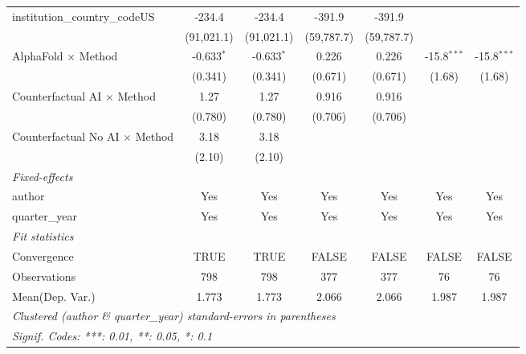\begin{tabular}{lcccccc}
   institution\_country\_codeUS          & -234.4       & -234.4       & -391.9      & -391.9      &               &   \\   
                                         & (91,021.1)   & (91,021.1)   & (59,787.7)  & (59,787.7)  &               &   \\   
   AlphaFold $\times$ Method             & -0.633$^{*}$ & -0.633$^{*}$ & 0.226       & 0.226       & -15.8$^{***}$ & -15.8$^{***}$\\   
                                         & (0.341)      & (0.341)      & (0.671)     & (0.671)     & (1.68)        & (1.68)\\   
   Counterfactual AI $\times$ Method     & 1.27         & 1.27         & 0.916       & 0.916       &               &   \\   
                                         & (0.780)      & (0.780)      & (0.706)     & (0.706)     &               &   \\   
   Counterfactual No AI $\times$ Method  & 3.18         & 3.18         &             &             &               &   \\   
                                         & (2.10)       & (2.10)       &             &             &               &   \\   
   \midrule
   \emph{Fixed-effects}\\
   author                                & Yes          & Yes          & Yes         & Yes         & Yes           & Yes\\  
   quarter\_year                         & Yes          & Yes          & Yes         & Yes         & Yes           & Yes\\  
   \midrule
   \emph{Fit statistics}\\
   Convergence                           &TRUE          & TRUE         & FALSE       & FALSE       & FALSE         & FALSE\\  
   Observations                          & 798          & 798          & 377         & 377         & 76            & 76\\  
Mean(Dep. Var.) & 1.773 & 1.773 & 2.066 & 2.066 & 1.987 & 1.987 \\
   \midrule \midrule
   \multicolumn{7}{l}{\emph{Clustered (author \& quarter\_year) standard-errors in parentheses}}\\
   \multicolumn{7}{l}{\emph{Signif. Codes: ***: 0.01, **: 0.05, *: 0.1}}\\
\end{tabular}
\par\endgroup
